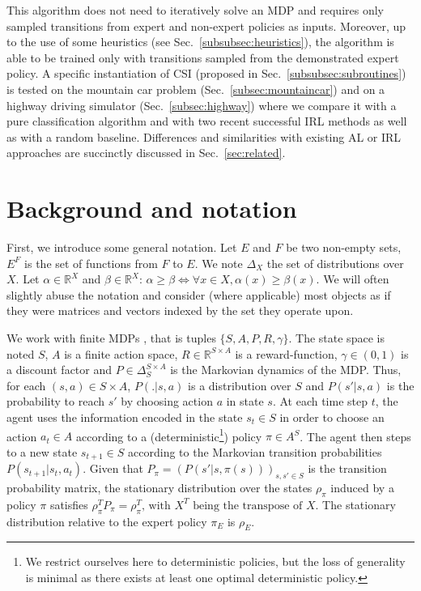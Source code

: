 \documentclass{llncs}
\begin{document}
This algorithm does not need to iteratively solve an MDP and requires only sampled transitions from expert and non-expert policies as inputs. Moreover, up to the use of some heuristics (see Sec.~\ref{subsubsec:heuristics}), the algorithm is able to be trained only with transitions sampled from the demonstrated expert policy. A specific instantiation of CSI (proposed in Sec.~\ref{subsubsec:subroutines}) is tested on the mountain car problem (Sec.~\ref{subsec:mountaincar}) and on a highway driving simulator (Sec.~\ref{subsec:highway}) where we compare it with a pure classification algorithm \cite{taskar2005learning} and with two recent successful IRL methods \cite{klein2012scirl} as well as with a random baseline. Differences and similarities with existing AL or IRL approaches are succinctly discussed in Sec.~\ref{sec:related}.
\section{Background and notation}
\label{sec:background}
First, we introduce some general notation.
Let $E$ and $F$ be two non-empty sets, $E^F$ is the set of functions from $F$ to $E$.
We note $\Delta_X$ the set of distributions over $X$.
Let $\alpha\in\mathbb{R}^X$ and $\beta\in\mathbb{R}^X$: $\alpha\geq\beta \Leftrightarrow \forall x\in X, \alpha(x) \geq \beta(x)$. We will often slightly abuse the notation and consider (where applicable) most objects as if they were matrices and vectors indexed by the set they operate upon.

We work with finite MDPs \cite{puterman1994markov}, that is tuples $\{S,A,P,R,\gamma\}$. The state space is noted $S$, $A$ is a finite action space, $R\in\mathbb{R}^{S\times A}$ is a reward-function, $\gamma\in (0,1)$ is a discount factor and $P\in \Delta_{S}^{S\times A}$ is the Markovian dynamics of the MDP. Thus, for each $(s,a)\in S\times A$, $P(.|s,a)$ is a distribution over $S$ and $P(s'|s,a)$ is the probability to reach $s'$ by choosing action $a$ in state $s$. At each time step $t$, the agent uses the information encoded in the state $s_t\in S$ in order to choose an action $a_t \in A$ according to a (deterministic\footnote{We restrict ourselves here to deterministic policies, but the loss of generality is minimal as there exists at least one optimal deterministic policy.}) policy $\pi\in A^S$. The agent then steps to a new state $s_{t+1}\in S$ according to the Markovian transition probabilities $P(s_{t+1}|s_t,a_t)$. Given that $P_\pi = (P(s'|s,\pi(s)))_{s,s' \in S}$ is the transition probability matrix, the stationary distribution over the states $\rho_\pi$ induced by a policy $\pi$ satisfies $\rho_\pi^TP_\pi = \rho_\pi^T\textrm{, with }X^T\textrm{ being the transpose of }X$.
The stationary distribution relative to the expert policy $\pi_E$ is $\rho_E$.
\end{document}
